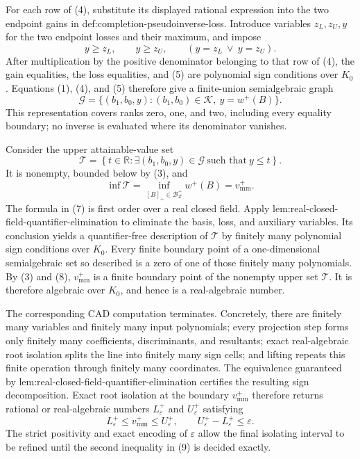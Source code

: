 For each row of (4), substitute its displayed rational expression into the two endpoint gains in def:completion-pseudoinverse-loss.  Introduce variables \(z_L,z_U,y\) for the two endpoint losses and their maximum, and impose
\[
 y\ge z_L,\qquad y\ge z_U,\qquad
 (y=z_L\ \vee\ y=z_U).
\tag{5}
\]
After multiplication by the positive denominator belonging to that row of (4), the gain equalities, the loss equalities, and (5) are polynomial sign conditions over \(K_0\).  Equations (1), (4), and (5) therefore give a finite-union semialgebraic graph
\[
 \mathcal G
 =\{(b_1,b_0,y):(b_1,b_0)\in\mathcal K,\ y=w^+(B)\}.
\tag{6}
\]
This representation covers ranks zero, one, and two, including every equality boundary; no inverse is evaluated where its denominator vanishes.

Consider the upper attainable-value set
\[
 \mathcal T
 =\left\{t\in\mathbb R:
   \exists (b_1,b_0,y)\in\mathcal G\ \text{such that}\ y\le t
  \right\}.
\tag{7}
\]
It is nonempty, bounded below by (3), and
\[
 \inf\mathcal T
 =\inf_{[B]_+\in\mathcal B_Z^+}w^+(B)
 =v_{\mathrm{mm}}^+.
\tag{8}
\]
The formula in (7) is first order over a real closed field.  Apply lem:real-closed-field-quantifier-elimination to eliminate the basis, loss, and auxiliary variables.  Its conclusion yields a quantifier-free description of \(\mathcal T\) by finitely many polynomial sign conditions over \(K_0\).  Every finite boundary point of a one-dimensional semialgebraic set so described is a zero of one of those finitely many polynomials.  By (3) and (8), \(v_{\mathrm{mm}}^+\) is a finite boundary point of the nonempty upper set \(\mathcal T\).  It is therefore algebraic over \(K_0\), and hence is a real-algebraic number.

The corresponding CAD computation terminates.  Concretely, there are finitely many variables and finitely many input polynomials; every projection step forms only finitely many coefficients, discriminants, and resultants; exact real-algebraic root isolation splits the line into finitely many sign cells; and lifting repeats this finite operation through finitely many coordinates.  The equivalence guaranteed by lem:real-closed-field-quantifier-elimination certifies the resulting sign decomposition.  Exact root isolation at the boundary \(v_{\mathrm{mm}}^+\) therefore returns rational or real-algebraic numbers \(L_\varepsilon^+\) and \(U_\varepsilon^+\) satisfying
\[
 L_\varepsilon^+\le v_{\mathrm{mm}}^+\le U_\varepsilon^+,
 \qquad
 U_\varepsilon^+-L_\varepsilon^+\le\varepsilon.
\tag{9}
\]
The strict positivity and exact encoding of \(\varepsilon\) allow the final isolating interval to be refined until the second inequality in (9) is decided exactly.

